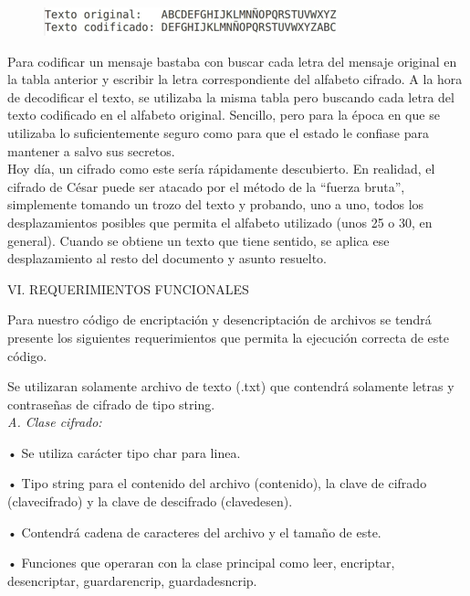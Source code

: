 \documentclass[9pt,24pt,twocolumn]{article}
\begin{document}
\begin{figure}[h]
  \centering
    \includegraphics{top1}
  \label{fig:top1}
\end{figure}

{Para codificar un mensaje bastaba con buscar cada letra del mensaje original en la tabla anterior y  escribir la letra correspondiente del alfabeto cifrado. A la hora de decodificar el texto, se utilizaba la misma tabla pero buscando cada letra del texto codificado en el alfabeto original. Sencillo, pero para la época en que se utilizaba lo suficientemente seguro como para que el estado le confiase para mantener a salvo sus secretos.}
\\

{Hoy día, un cifrado como este sería rápidamente descubierto. En realidad, el cifrado de César puede ser atacado por el método de la “fuerza bruta”, simplemente tomando un trozo del texto y probando, uno a uno, todos los desplazamientos posibles que permita el alfabeto utilizado (unos 25 o 30, en general). Cuando se obtiene un texto que tiene sentido, se aplica ese desplazamiento al resto del documento y asunto resuelto.}
\\

\begin{center}
{VI.  REQUERIMIENTOS FUNCIONALES}
\end{center}

{Para nuestro código de encriptación y desencriptación de archivos se tendrá presente los siguientes requerimientos que permita la ejecución correcta de este código.} 

{Se utilizaran solamente archivo de texto (.txt) que contendrá solamente letras y contraseñas de cifrado de tipo string.}
\\

\textit{A. Clase cifrado:}

{• Se utiliza carácter tipo char para linea.}

{• Tipo string para el contenido del archivo (contenido), la clave de cifrado (clavecifrado) y la clave de descifrado
(clavedesen).}

{• Contendrá cadena de caracteres del archivo y el tamaño de este.}

{• Funciones que operaran con la clase principal como leer, encriptar, desencriptar, guardarencrip, guardadesncrip.}
\\
\end{document}
